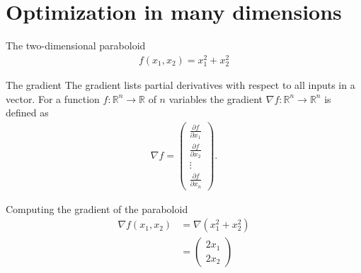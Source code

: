 \documentclass[notes]{beamer}
\begin{document}
    \section{Optimization in many dimensions}

    \begin{frame}{The two-dimensional paraboloid}
      \begin{align}
        f(x_1, x_2) = x_1^2 + x_2^2
      \end{align}
      \begin{figure}
        \centering
        
      \end{figure}
    \end{frame}

    \begin{frame}{The gradient}
      The gradient lists partial derivatives with respect to all inputs in a vector.
      For a function $f : \mathbb{R}^n \rightarrow \mathbb{R}$ of $n$ variables the gradient
      $\nabla f: \mathbb{R}^n \rightarrow \mathbb{R}^n$ is defined as
      \begin{align}
        \nabla f = \begin{pmatrix}
          \frac{\partial f}{\partial x_1} \\
          \frac{\partial f}{\partial x_2} \\
          \vdots \\
          \frac{\partial f}{\partial x_n} 
        \end{pmatrix}.
      \end{align}
    \end{frame}

    \begin{frame}{Computing the gradient of the paraboloid}
      \begin{align}
        \nabla f(x_1, x_2) &= \nabla (x_1^2 + x_2^2) \\
                           &= \begin{pmatrix}
                              2x_1 \\
                              2x_2
                              \end{pmatrix}
      \end{align}
    \end{frame}
\end{document}
